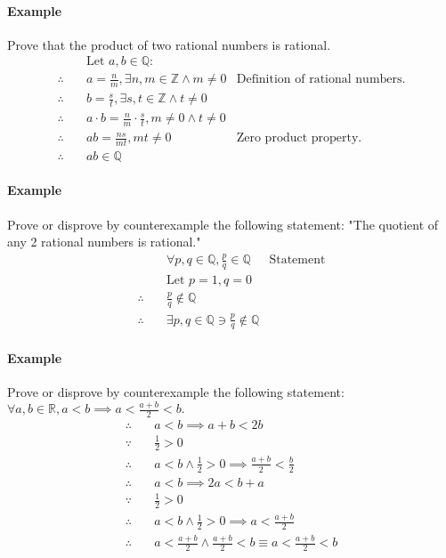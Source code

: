 \paragraph*{Example}
Prove that the product of two rational numbers is rational.
\begin{align*}
    &\text{Let } a,b \in \mathbb{Q}:\\
    \therefore \quad & a = \frac{n}{m}, \exists n,m \in \mathbb{Z} \land m \neq 0 & \text{Definition of rational numbers.}\\
    \therefore \quad & b = \frac{s}{t}, \exists s,t \in \mathbb{Z} \land t \neq 0\\
    \therefore \quad & a \cdot b = \frac{n}{m} \cdot \frac{s}{t}, m \neq 0 \land t \neq 0\\
    \therefore \quad & ab = \frac{ns}{mt}, mt \neq 0 & \text{Zero product property.}\\
    \therefore \quad & ab \in \mathbb{Q}
\end{align*}

\paragraph*{Example}
Prove or disprove by counterexample the following statement: "The quotient of any 2 rational numbers is rational."
\begin{align*}
    & \forall p,q \in \mathbb{Q}, \frac{p}{q} \in \mathbb{Q} & \text{Statement}\\
    & \text{Let } p=1,q=0\\
    \therefore \quad & \frac{p}{q} \notin \mathbb{Q}\\
    \therefore \quad & \exists p,q \in \mathbb{Q} \ni \frac{p}{q} \notin \mathbb{Q}
\end{align*}

\paragraph*{Example}
Prove or disprove by counterexample the following statement: $\forall a,b \in \mathbb{R}, a<b \implies a<\frac{a+b}{2}<b.$
\begin{align*}
    \therefore \quad & a < b \implies a + b < 2b\\
    \because \quad & \frac{1}{2} > 0\\
    \therefore \quad & a < b \land \frac{1}{2} > 0 \implies \frac{a+b}{2} < \frac{b}{2}\\
    \therefore \quad & a < b \implies 2a < b + a\\
    \because \quad & \frac{1}{2} > 0\\
    \therefore \quad & a < b \land \frac{1}{2} > 0 \implies a < \frac{a+b}{2}\\
    \therefore \quad & a < \frac{a+b}{2} \land \frac{a+b}{2} < b \equiv a < \frac{a+b}{2} < b\\
\end{align*}